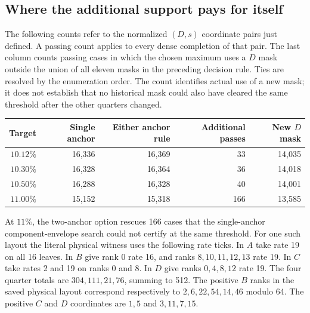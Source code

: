 \subsection{Where the additional support pays for itself}

The following counts refer to the normalized \((D,s)\) coordinate pairs just defined. A passing count applies to every dense completion of that pair. The last column counts passing cases in which the chosen maximum uses a \(D\) mask outside the union of all eleven masks in the preceding decision rule. Ties are resolved by the enumeration order. The count identifies actual use of a new mask; it does not establish that no historical mask could also have cleared the same threshold after the other quarters changed.
\begin{center}
\begin{tabular}{@{}rrrrr@{}}
\toprule
Target & Single anchor & Either anchor rule & Additional passes & New \(D\) mask\\
\midrule
\(10.12\%\) & 16,336 & 16,369 & 33 & 14,035\\
\(10.30\%\) & 16,328 & 16,364 & 36 & 14,018\\
\(10.50\%\) & 16,288 & 16,328 & 40 & 14,001\\
\(11.00\%\) & 15,152 & 15,318 & 166 & 13,585\\
\bottomrule
\end{tabular}
\end{center}
At \(11\%\), the two-anchor option rescues 166 cases that the single-anchor component-envelope search could not certify at the same threshold. For one such layout the literal physical witness uses the following rate ticks. In \(A\) take rate 19 on all 16 leaves. In \(B\) give rank 0 rate 16, and ranks \(8,10,11,12,13\) rate 19. In \(C\) take rates 2 and 19 on ranks 0 and 8. In \(D\) give ranks \(0,4,8,12\) rate 19. The four quarter totals are \(304,111,21,76\), summing to 512. The positive \(B\) ranks in the saved physical layout correspond respectively to \(2,6,22,54,14,46\) modulo 64. The positive \(C\) and \(D\) coordinates are \(1,5\) and \(3,11,7,15\).

